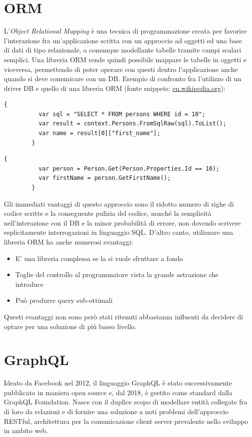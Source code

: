 \documentclass[a4paper, 12pt]{report}
\begin{document}
    \section{ORM}
      L'\emph{Object Relational Mapping} è una tecnica di programmazione creata per favorire l'interazione fra un'applicazione scritta con un approccio ad oggetti ed una base di dati di tipo relazionale, o comunque modellante tabelle tramite campi scalari semplici.
      Una libreria ORM rende quindi possibile mappare le tabelle in oggetti e viceversa, permettendo di poter operare con questi dentro l'applicazione anche quando si deve comunicare con un DB.
      Esempio di confronto fra l'utilizzo di un driver DB e quello di una libreria ORM (fonte snippets: \href{https://en.wikipedia.org/wiki/Object%E2%80%93relational_mapping}{en.wikipedia.org}):
      \begin{Verbatim}[samepage=true]
        {
          var sql = "SELECT * FROM persons WHERE id = 10";
          var result = context.Persons.FromSqlRaw(sql).ToList();
          var name = result[0]["first_name"];
        }
      \end{Verbatim}
      \begin{Verbatim}[samepage=true]
        {
          var person = Person.Get(Person.Properties.Id == 10);
          var firstName = person.GetFirstName();
        }
      \end{Verbatim}
      Gli immediati vantaggi di questo approccio sono il ridotto numero di righe di codice scritte e la conseguente pulizia del codice, nonché la semplicità nell'interazione con il DB e la minor probabilità di errore, non dovendo scrivere esplicitamente interrogazioni in linguaggio SQL.
      D'altro canto, utilizzare una libreria ORM ha anche numerosi svantaggi:
      \begin{itemize}
        \item E' una libreria complessa se la si vuole sfruttare a fondo
        \item Toglie del controllo al programmatore vista la grande astrazione che introduce
        \item Può produrre query sub-ottimali
      \end{itemize}
      Questi svantaggi non sono però stati ritenuti abbastanza influenti da decidere di optare per una soluzione di più basso livello.
    \section{GraphQL}
      Ideato da Facebook nel 2012, il linguaggio GraphQL è stato successivamente pubblicato in maniera open source e, dal 2018, è gestito come standard dalla GraphQL Foundation.
      Nasce con il duplice scopo di modellare entità collegate fra di loro da relazioni e di fornire una soluzione a noti problemi dell'approccio RESTful, architettura per la comunicazione client server prevalente nello sviluppo in ambito web.
\end{document}
